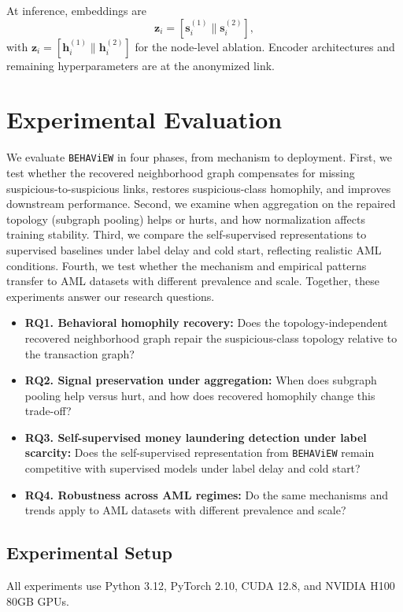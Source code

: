 \documentclass[sigconf,natbib=true,anonymous=true]{acmart}
\theoremstyle{definition}
\newcommand{\method}{\texttt{BEHAViEW}\xspace}
\begin{document}
At inference, embeddings are
\begin{equation}\label{eq:concat}
    \mathbf{z}_i = [\mathbf{s}_i^{(1)} \| \mathbf{s}_i^{(2)}],
\end{equation}
with $\mathbf{z}_i = [\mathbf{h}_i^{(1)} \| \mathbf{h}_i^{(2)}]$ for the node-level ablation. Encoder architectures and remaining hyperparameters are at the anonymized link.

\section{Experimental Evaluation}
\label{sec:experiments}
We evaluate \method in four phases, from mechanism to deployment. First, we test whether the recovered neighborhood graph compensates for missing suspicious-to-suspicious links, restores suspicious-class homophily, and improves downstream performance. Second, we examine when aggregation on the repaired topology (subgraph pooling) helps or hurts, and how normalization affects training stability. Third, we compare the self-supervised representations to supervised baselines under label delay and cold start, reflecting realistic AML conditions. Fourth, we test whether the mechanism and empirical patterns transfer to AML datasets with different prevalence and scale. Together, these experiments answer our research questions.

\begin{itemize}
\item \textbf{RQ1. Behavioral homophily recovery:} Does the topology-independent recovered neighborhood graph repair the suspicious-class topology relative to the transaction graph?
\item \textbf{RQ2. Signal preservation under aggregation:} When does subgraph pooling help versus hurt, and how does recovered homophily change this trade-off?
\item \textbf{RQ3. Self-supervised money laundering detection under label scarcity:} Does the self-supervised representation from \method remain competitive with supervised models under label delay and cold start?
\item \textbf{RQ4. Robustness across AML regimes:} Do the same mechanisms and trends apply to AML datasets with different prevalence and scale?
\end{itemize}

\subsection{Experimental Setup}
All experiments use Python 3.12, PyTorch 2.10, CUDA 12.8, and NVIDIA H100 80GB GPUs.
\end{document}
